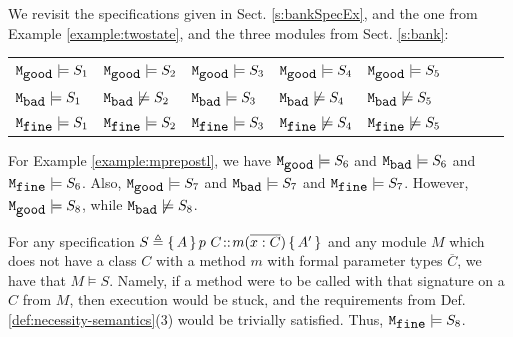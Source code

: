 {{%
 \begin{example}
 \label{example:twostatesarisfy}
 {We   revisit the specifications given in Sect. \ref{s:bankSpecEx}, and the one from Example \ref{example:twostate}, and  the three  modules from Sect. \ref{s:bank}:}


\begin{tabular}{lllllllll}
$\ModA  \models S_1$  &   $\ModA  \models S_2$ &  $\ModA \models S_3$ &   $\ModA \models S_4$    & $\ModA \models S_5$\\
 $\ModB \models S_1$  &   $\ModB \not\models S_2$   &  $\ModB  \models S_3$   &  $\ModB  \not\models S_4$   & $\ModB \not\models S_5$ \\
 $\ModC  \models S_1$    & $\ModC \models S_2$ &   $\ModC \models S_3$    &$\ModC \not\models S_4$   & $\ModC \not\models S_5$ 
\end{tabular}
\end{example}
 

 
 \begin{example}
 \label{example:mprepostlsatissy}
 For  %
 Example \ref{example:mprepostl}, we have
  $\ModA \models S_6$ and $\ModB \models S_6$ and  $\ModC \models S_6$.
Also,  $\ModA \models S_7$ and $\ModB \models S_7$ and  $\ModC \models S_7$.
However,   $\ModA  \models S_8$, while $\ModB  \not\models S_8$.
\end{example}

 \begin{example}
\label{example:mprepostlsatissy}
 For  %
any   specification  $S \triangleq {\mprepost{A}{p\ C}{m}{x}{C}{A'} }$ and any module  $M$ which does not have a class $C$  with a method $m$ with formal parameter  types ${\overline C}$, we have that $M \models S$.
Namely, if a method were to be called with that signature on a $C$  from $M$, then execution would be stuck, and the requirements from Def. \ref{def:necessity-semantics}(3) would be trivially satisfied.
Thus,   $\ModC \models S_8$. %
\end{example}

 

}}
